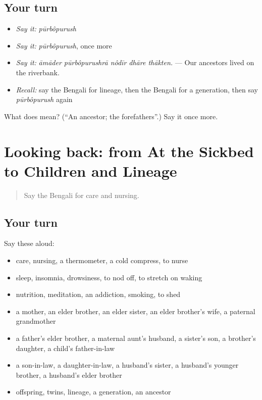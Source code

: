 \subsection*{Your turn}
\begin{itemize}
\raggedright
  \item \emph{Say it:} \emph{pūrbôpurush}
  \item \emph{Say it:} \emph{pūrbôpurush}, once more
  \item \emph{Say it:} \emph{āmāder pūrbôpurushrā nôdīr dhāre thākten.} — Our ancestors lived on the riverbank.
  \item \emph{Recall:} say the Bengali for lineage, then the Bengali for a generation, then say \emph{pūrbôpurush} again
\end{itemize}

\begin{tcolorbox}[breakable,colback=teal!4,colframe=teal!35!black,title={Before you move on}]
What does  mean? (\textquotedblleft{}An ancestor; the forefathers\textquotedblright{}.) Say it once more.
\end{tcolorbox}
\section[(dialogue)]{Looking back: from At the Sickbed to Children and Lineage}

\label{lesson:BN-R484-review-478-484}



\begin{quote}
Say the Bengali for care and nursing.
\end{quote}

\subsection*{Your turn}
Say these aloud:

\begin{itemize}
\raggedright
  \item care, nursing, a thermometer, a cold compress, to nurse
  \item sleep, insomnia, drowsiness, to nod off, to stretch on waking
  \item nutrition, meditation, an addiction, smoking, to shed
  \item a mother, an elder brother, an elder sister, an elder brother's wife, a paternal grandmother
  \item a father's elder brother, a maternal aunt's husband, a sister's son, a brother's daughter, a child's father-in-law
  \item a son-in-law, a daughter-in-law, a husband's sister, a husband's younger brother, a husband's elder brother
  \item offspring, twins, lineage, a generation, an ancestor
\end{itemize}

